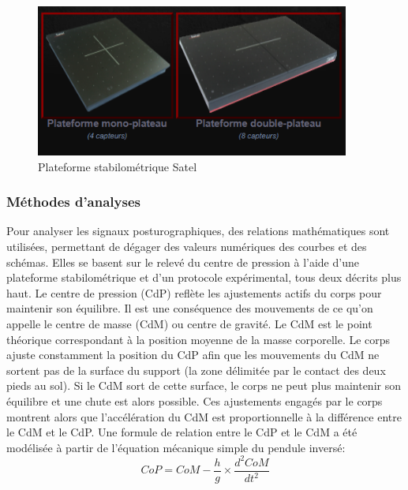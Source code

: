 \begin{figure}[H]
    \centering
    \includegraphics[height=5cm]{images/pression_plantaire/satel.png}
    \caption{Plateforme stabilométrique Satel}\label{fig:satel}
\end{figure}
 


\subsubsection{Méthodes d’analyses}

Pour analyser les signaux posturographiques, des relations mathématiques sont utilisées, permettant de dégager des valeurs numériques des courbes et des schémas. Elles se basent sur le relevé du centre de pression à l’aide d’une plateforme stabilométrique et d’un protocole expérimental, tous deux décrits plus haut.
Le centre de pression (CdP) reflète les ajustements actifs du corps pour maintenir son équilibre. Il est une conséquence des mouvements de ce qu’on appelle le centre de masse (CdM) ou centre de gravité. Le CdM est le point théorique correspondant à la position moyenne de la masse corporelle. Le corps ajuste constamment la position du CdP afin que les mouvements du CdM ne sortent pas de la surface du support (la zone délimitée par le contact des deux pieds au sol). Si le CdM sort de cette surface, le corps ne peut plus maintenir son équilibre et une chute est alors possible. Ces ajustements engagés par le corps montrent alors que l’accélération du CdM est proportionnelle à la différence entre le CdM et le CdP. Une formule de relation entre le CdP et le CdM a été modélisée à partir de l’équation mécanique simple du pendule inversé:\\
\[
    CoP = CoM - \frac{h}{g} \times \frac{d^2 CoM}{dt^2} 
\]

